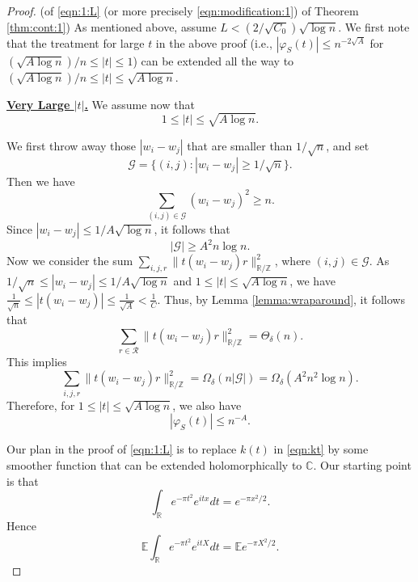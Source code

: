 \documentclass[reqno]{amsart}
\newcommand\R{{\mathbb{R}}}
\newcommand\C{{\mathbb{C}}}
\newcommand\Z{{\mathbb{Z}}}
\newcommand\E{{\mathbb{E}}}
\newcommand\CG{{\mathcal G}}
\newcommand\CR{{\mathcal R}}
\theoremstyle{plain}
\theoremstyle{definition}
\begin{document}
\begin{proof}(of \eqref{eqn:1:L} (or more precisely  \eqref{eqn:modification:1}) of Theorem \ref{thm:cont:1}) As mentioned above, assume $L< (2 /\sqrt{C_{0}})\sqrt{ \log n}$. We first note that the treatment for large $t$ in the above proof (i.e., $|\varphi_S(t)|\le n^{-2\sqrt{A}}$ for $(\sqrt{A\log n})/n \le |t| \le 1$) can be extended all the way to 
$(\sqrt{A\log n})/n\le |t| \le \sqrt{A\log n}$.

\underline{\bf Very Large $|t|$.} We assume now that 
$$1 \le |t| \le  \sqrt{A\log n}.$$

We first throw away those $|w_{i}-w_{j}|$ that are smaller than $1/\sqrt{n}$, and set 
$$\CG=\{(i,j): |w_{i}-w_{j}| \ge 1/\sqrt{n}\}.$$
Then we have 
$$\sum_{(i,j)\in \CG} (w_{i}-w_{j})^{2} \ge n.$$
Since $|w_{i}-w_{j}| \le 1/A\sqrt{\log n}$, it follows that 
$$|\CG| \ge A^{2} n \log n.$$
Now we consider the sum $\sum_{i,j,r} \|t (w_{i}-w_{j})r\|_{\R/\Z}^{2}$, where $(i,j) \in \CG$. As $1/\sqrt{n}  \le |w_{i}-w_{j}| \le 1/A\sqrt{\log n}$ and $1 \le |t| \le  \sqrt{A\log n}$, we have 
$\frac{1}{\sqrt{n}}  \le |t (w_{i}-w_{j})| \le \frac{1}{\sqrt{A}}<\frac{1}{C}$.
Thus, by Lemma \ref{lemma:wraparound}, it follows that 
$$  \sum_{r \in \CR} \|t (w_{i}-w_{j}) r\|_{\R/\Z}^{2} =\Theta_{\delta}(n).$$
This implies 
$$\sum_{i,j,r} \|t (w_{i}-w_{j})r\|_{\R/\Z}^{2} =\Omega_{\delta}(n |\CG|) =\Omega_{\delta}(A^2n^{2}\log n).$$
Therefore, for $1\le |t|\le \sqrt{A\log n}$, we also 
have
\begin{equation}\label{eqn:L:large:t}
|\varphi_{S}(t)| \le n^{-A}.
\end{equation}


Our plan in the proof of \eqref{eqn:1:L} is to replace $k(t)$ in \eqref{eqn:kt} by some smoother function that can be extended holomorphically to $\C$. Our starting point is that
\begin{equation}\label{eqn:identity:1d}
\int_{\R} e^{-\pi t^{2}} e^{i t x} dt = e^{-\pi x^{2}/2}.
\end{equation}
Hence
$$\E \int_{\R} e^{-\pi t^{2}} e^{i t X} dt = \E e^{-\pi X^{2}/2}.$$


\end{proof}
\end{document}

